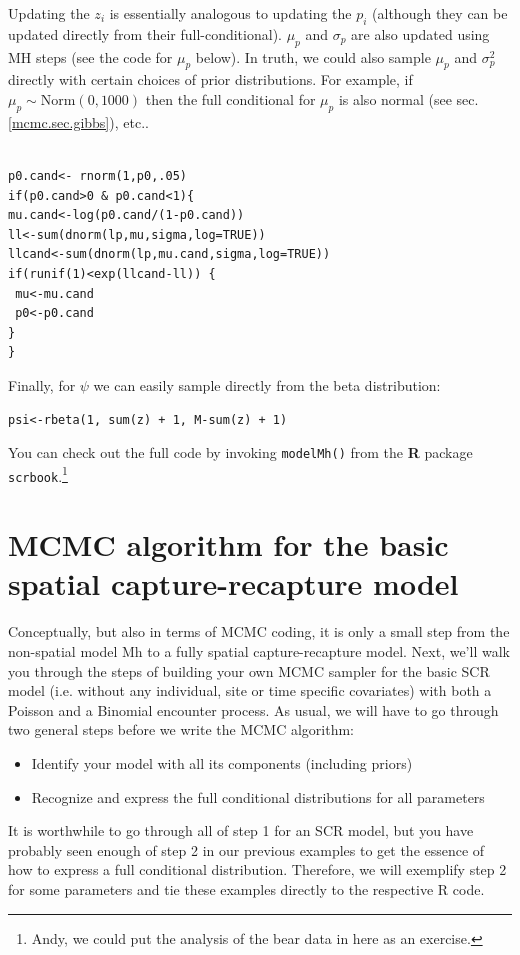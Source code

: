 Updating the $z_{i}$ is essentially analogous to updating the $p_{i}$ (although they can be updated directly from their full-conditional). $\mu_{p}$ and $\sigma_{p}$ are also updated using MH steps (see the code for $\mu_{p}$ below). In truth, we could also sample $\mu_{p}$
and $\sigma_{p}^{2}$ directly with certain choices of prior
distributions. For example, if $\mu_{p} \sim \mbox{Norm}(0, 1000)$
then the full conditional for $\mu_{p}$ is also normal (see
sec. \ref{mcmc.sec.gibbs}), etc..

\begin{verbatim}

p0.cand<- rnorm(1,p0,.05)
if(p0.cand>0 & p0.cand<1){
mu.cand<-log(p0.cand/(1-p0.cand))
ll<-sum(dnorm(lp,mu,sigma,log=TRUE))
llcand<-sum(dnorm(lp,mu.cand,sigma,log=TRUE))
if(runif(1)<exp(llcand-ll)) {
 mu<-mu.cand
 p0<-p0.cand
}
}

\end{verbatim}

Finally, for $\psi$ we can easily sample directly from the beta distribution:

\begin{verbatim}
psi<-rbeta(1, sum(z) + 1, M-sum(z) + 1)
\end{verbatim}

You can check out the full code by invoking \mbox{\tt modelMh()} from the {\bf R} package \mbox{\tt scrbook}.\footnote{Andy, we could put the analysis of the bear data in here as an exercise.} 

\section{MCMC algorithm for the basic spatial capture-recapture model}

Conceptually, but also in terms of MCMC coding, it is only a small step from the non-spatial model Mh to a fully spatial capture-recapture model. Next, we'll walk you through the steps of building your own MCMC sampler for the basic SCR model (i.e. without any individual, site or time specific covariates) with both a Poisson and a Binomial encounter process.
As usual, we will have to go through two general steps before we write the MCMC algorithm:
\begin{itemize}
\item[  (1)] Identify your model with all its components (including
    priors)
\item[  (2)] Recognize and express the full conditional distributions for
    all parameters
\end{itemize}
It is worthwhile to go through all of step 1 for an SCR model, but you
have probably seen enough of step 2 in our previous examples to get
the essence of how to express a full conditional
distribution. Therefore, we will exemplify step 2 for some parameters
and tie these examples directly to the respective R code.

